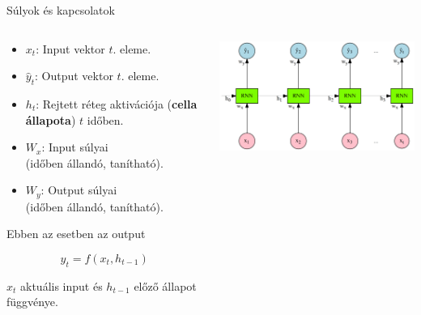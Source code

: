 \documentclass[english, aspectratio=169]{beamer}
\begin{document}
\begin{frame}{Súlyok és kapcsolatok}
\begin{columns}
\begin{column}{.4\textwidth}
\hspace{-2cm}
\begin{itemize}
	\item $x_t$: Input vektor $t$. eleme.
	\item $\hat{y}_t$: Output vektor $t$. eleme.
	\item $h_t$: Rejtett réteg aktivációja (\textbf{cella állapota}) $t$ időben.
	\item $W_x$: Input súlyai \\(időben állandó, tanítható).
	\item $W_y$: Output súlyai \\(időben állandó, tanítható).
\end{itemize}
Ebben az esetben az output
\begin{block}{}
\vspace{-0.2cm}
\[
\hat{y}_t = f(x_t, h_{t-1})
\]
\end{block}
$x_t$ aktuális input és $h_{t-1}$ előző állapot függvénye.
\end{column}
\begin{column}{.7\textwidth}
\begin{center}
\includegraphics[width=9.5cm, keepaspectratio]{graphs/recurrent_5.png}
\end{center}
\end{column}
\end{columns}
\end{frame}
\end{document}
